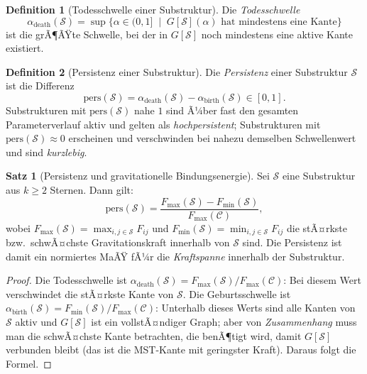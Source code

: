 ﻿\documentclass[a4paper,12pt]{report}
\theoremstyle{definition}
\newtheorem{definition}{Definition}
\newtheorem{satz}{Satz}
\begin{document}
\begin{definition}[Todesschwelle einer Substruktur]
\label{def:tod}
Die \emph{Todesschwelle}
\[
\alpha_\mathrm{death}(\mathcal{S}) = \sup\bigl\{\alpha \in (0,1] \;\mid\; G[\mathcal{S}](\alpha) \text{ hat mindestens eine Kante}\bigr\}
\]
ist die grÃ¶ÃŸte Schwelle, bei der in $G[\mathcal{S}]$ noch mindestens eine aktive Kante existiert.
\end{definition}

\begin{definition}[Persistenz einer Substruktur]
\label{def:persistenz}
Die \emph{Persistenz} einer Substruktur $\mathcal{S}$ ist die Differenz
\[
\mathrm{pers}(\mathcal{S}) = \alpha_\mathrm{death}(\mathcal{S}) - \alpha_\mathrm{birth}(\mathcal{S}) \in [0, 1].
\]
Substrukturen mit $\mathrm{pers}(\mathcal{S})$ nahe $1$ sind Ã¼ber fast den gesamten Parameterverlauf aktiv und gelten als \emph{hochpersistent}; Substrukturen mit $\mathrm{pers}(\mathcal{S}) \approx 0$ erscheinen und verschwinden bei nahezu demselben Schwellenwert und sind \emph{kurzlebig}.
\end{definition}

\begin{satz}[Persistenz und gravitationelle Bindungsenergie]
\label{satz:persistenz_energie}
Sei $\mathcal{S}$ eine Substruktur aus $k \geq 2$ Sternen. Dann gilt:
\[
\mathrm{pers}(\mathcal{S})
= \frac{F_\mathrm{max}(\mathcal{S}) - F_\mathrm{min}(\mathcal{S})}{F_\mathrm{max}(\mathcal{C})},
\]
wobei $F_\mathrm{max}(\mathcal{S}) = \max_{i,j \in \mathcal{S}} F_{ij}$ und $F_\mathrm{min}(\mathcal{S}) = \min_{i,j \in \mathcal{S}} F_{ij}$ die stÃ¤rkste bzw.\ schwÃ¤chste Gravitationskraft innerhalb von $\mathcal{S}$ sind. Die Persistenz ist damit ein normiertes MaÃŸ fÃ¼r die \emph{Kraftspanne} innerhalb der Substruktur.
\end{satz}

\begin{proof}
Die Todesschwelle ist $\alpha_\mathrm{death}(\mathcal{S}) = F_\mathrm{max}(\mathcal{S})/F_\mathrm{max}(\mathcal{C})$: Bei diesem Wert verschwindet die stÃ¤rkste Kante von $\mathcal{S}$. Die Geburtsschwelle ist $\alpha_\mathrm{birth}(\mathcal{S}) = F_\mathrm{min}(\mathcal{S})/F_\mathrm{max}(\mathcal{C})$: Unterhalb dieses Werts sind alle Kanten von $\mathcal{S}$ aktiv und $G[\mathcal{S}]$ ist ein vollstÃ¤ndiger Graph; aber von \emph{Zusammenhang} muss man die schwÃ¤chste Kante betrachten, die benÃ¶tigt wird, damit $G[\mathcal{S}]$ verbunden bleibt (das ist die MST-Kante mit geringster Kraft). Daraus folgt die Formel.
\end{proof}
\end{document}
